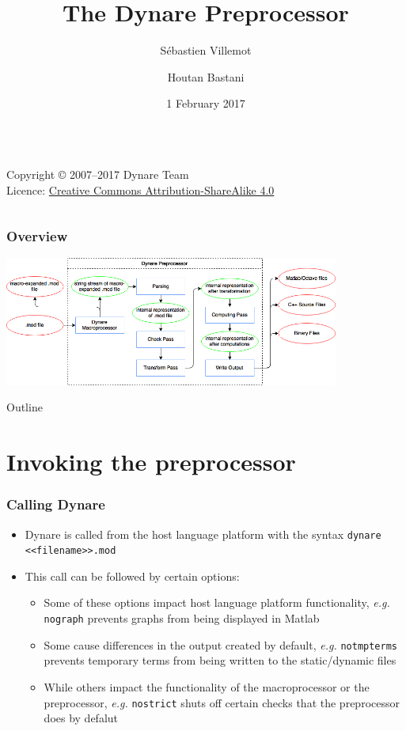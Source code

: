 \documentclass{beamer}
\title{The Dynare Preprocessor}
\author[S. Villemot, H.Bastani]{Sébastien Villemot \and Houtan Bastani}
\institute{CEPREMAP}
\date{1 February 2017}
\begin{document}
\begin{frame}
  \titlepage

  \begin{columns}[T]

    \ccbysa
    \tiny
    Copyright © 2007--2017 Dynare Team \\
    Licence: \href{http://creativecommons.org/licenses/by-sa/4.0/}{Creative
      Commons Attribution-ShareAlike 4.0}
  \end{columns}
\end{frame}

\begin{frame}
  \frametitle{Overview}
  \begin{center}
    \includegraphics[width=11cm]{overview.png}
  \end{center}
\end{frame}

\begin{frame}{Outline}
  \tableofcontents
\end{frame}

\section{Invoking the preprocessor}

\begin{frame}
  \frametitle{Calling Dynare}
  \begin{itemize}
  \item Dynare is called from the host language platform with the syntax \texttt{dynare <<filename>>.mod}
  \item This call can be followed by certain options:
    \begin{itemize}
    \item Some of these options impact host language platform functionality, \textit{e.g.} \texttt{nograph} prevents graphs from being displayed in Matlab
    \item Some cause differences in the output created by default, \textit{e.g.} \texttt{notmpterms} prevents temporary terms from being written to the static/dynamic files
    \item While others impact the functionality of the macroprocessor or the preprocessor, \textit{e.g.} \texttt{nostrict} shuts off certain checks that the preprocessor does by defalut
    \end{itemize}
  \end{itemize}
\end{frame}
\end{document}
